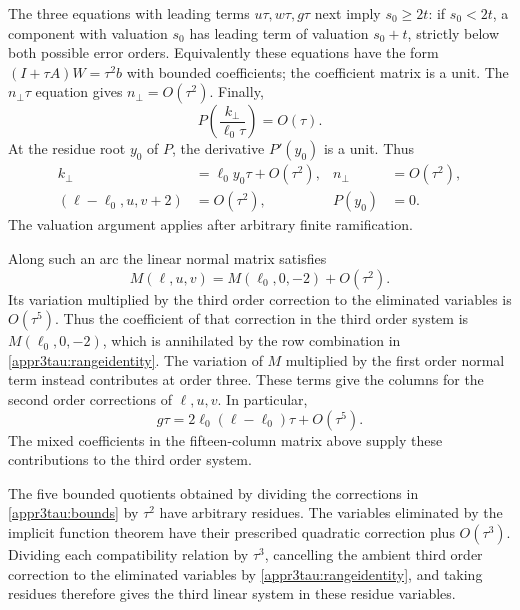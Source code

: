 \documentclass[11pt,a4paper]{article}
\numberwithin{equation}{section}
\theoremstyle{plain}
\theoremstyle{definition}
\theoremstyle{remark}
\begin{document}
The three equations with leading terms $u\tau,w\tau,g\tau$ next imply
$s_0\ge2t$: if $s_0<2t$, a component with valuation $s_0$ has leading
term of valuation $s_0+t$, strictly below both possible error orders.
Equivalently these equations have the form
$(I+\tau A)W=\tau^2b$ with bounded coefficients; the coefficient matrix
is a unit.  The $n_\perp\tau$ equation gives $n_\perp=O(\tau^2)$.  Finally,
\[
 P\left(\frac{k_\perp}{\ell_0\tau}\right)=O(\tau).
\]
At the residue root $y_0$ of $P$, the derivative $P'(y_0)$ is a unit.
Thus
\begin{equation}\label{appr3tau:bounds}
 \begin{aligned}
 k_\perp&=\ell_0y_0\tau+O(\tau^2),& n_\perp&=O(\tau^2),\\
 (\ell-\ell_0,u,v+2)&=O(\tau^2),&P(y_0)&=0.
 \end{aligned}
\end{equation}
The valuation argument applies after arbitrary finite ramification.

Along such an arc the linear normal matrix satisfies
\[
 M(\ell,u,v)=M(\ell_0,0,-2)+O(\tau^2).
\]
Its variation multiplied by the third order correction to the
eliminated variables is $O(\tau^5)$. Thus the coefficient of that
correction in the third order system is $M(\ell_0,0,-2)$, which is
annihilated by the row combination in \eqref{appr3tau:rangeidentity}.
The variation of $M$ multiplied by the first order normal term instead
contributes at order three. These terms give the columns for the
second order corrections of $\ell,u,v$. In particular,
\[
 g\tau=2\ell_0(\ell-\ell_0)\tau+O(\tau^5).
\]
The mixed coefficients in the fifteen-column matrix above supply
these contributions to the third order system.

The five bounded quotients obtained by dividing the corrections in
\eqref{appr3tau:bounds} by $\tau^2$ have arbitrary residues.  The
variables eliminated by the implicit function theorem have their prescribed quadratic correction plus
$O(\tau^3)$.  Dividing each compatibility relation by $\tau^3$, cancelling
the ambient third order correction to the eliminated variables by
\eqref{appr3tau:rangeidentity}, and taking residues therefore gives
the third linear system in these residue variables.
\end{document}

